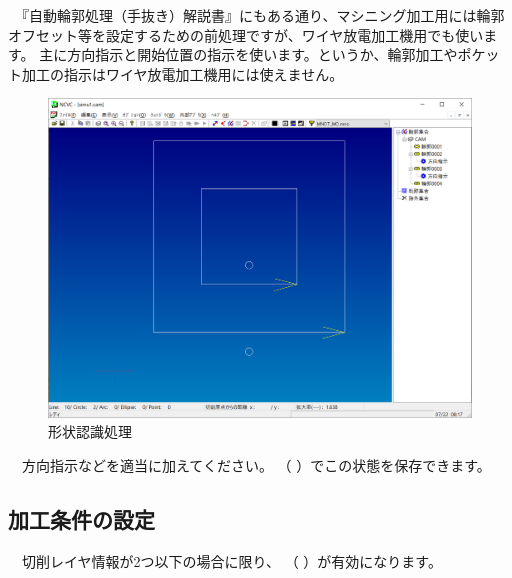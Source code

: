 　『自動輪郭処理（手抜き）解説書』にもある通り、マシニング加工用には輪郭オフセット等を設定するための前処理ですが、ワイヤ放電加工機用でも使います。
主に方向指示と開始位置の指示を使います。というか、輪郭加工やポケット加工の指示はワイヤ放電加工機用には使えません。

\begin{figure}[H]
\centering
\includegraphics[scale=0.5]{No1/fig/keijyo.png}
\caption{形状認識処理}
\label{fig:keijyo.png}
\end{figure}

　方向指示などを適当に加えてください。
（\,\,）でこの状態を保存できます。

\newpage %
\subsection{加工条件の設定}
　切削レイヤ情報が2つ以下の場合に限り、
（\,\,）が有効になります。

